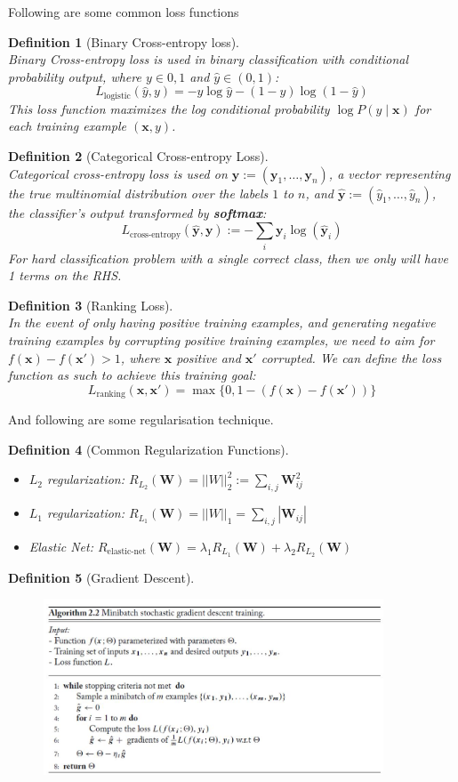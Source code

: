 \documentclass[12pt]{article}
\newtheorem{definition}{Definition}[section]
\theoremstyle{definition}
\newcommand{\x}{\mathbf{x}}
\newcommand{\y}{\mathbf{y}}
\begin{document}
Following are some common loss functions
\begin{definition}[Binary Cross-entropy loss]
\hfill\\\normalfont Binary Cross-entropy loss is used in binary classification with conditional probability output, where $y\in{0,1}$ and $\hat{y}\in(0,1)$:
\[
L_{\text{logistic}}(\hat{y},y)=-y\log \hat{y}-(1-y)\log(1-\hat{y})
\]
This loss function maximizes the log conditional probability $\log P(y\mid \x)$ for each training example $(\x, y)$.
\end{definition}
\begin{definition}[Categorical Cross-entropy Loss]
\hfill\\\normalfont Categorical cross-entropy loss is used on $\y:=(\y_1,\ldots, \y_n)$, a vector representing the true multinomial distribution over the labels $1$ to $n$, and $\hat{\y}:=(\hat{y}_1,\ldots, \hat{y}_n)$, the classifier's output transformed by \textbf{softmax}:
\[
L_{\text{cross-entropy}}(\hat{\y}, \y):=-\sum_{i}\y_i\log(\hat{\y}_i)
\]
For hard classification problem with a single correct class, then we only will have 1 terms on the RHS.
\end{definition}
\begin{definition}[Ranking Loss]
\hfill\\\normalfont In the event of only having positive training examples, and generating negative training examples by corrupting positive training examples, we need to aim for $f(\x)-f(\x')>1$, where $\x$ positive and $\x'$ corrupted. We can define the loss function as such to achieve this training goal:
\[
L_{\text{ranking}}(\x, \x')=\max\{0,1-(f(\x)-f(\x'))\}
\]
\end{definition}
And following are some regularisation technique.
\begin{definition}[Common Regularization Functions]
\begin{itemize}
	\item $L_2$ regularization: $R_{L_2}(\mathbf{W})=||W||_2^2:=\sum_{i,j}\mathbf{W}_{ij}^2$
	\item $L_1$ regularization: $R_{L_1}(\mathbf{W})=||W||_1 = \sum_{i,j}|\mathbf{W}_{ij}|$
	\item Elastic Net: $R_{\text{elastic-net}}(\mathbf{W})=\lambda_1R_{L_1}(\mathbf{W})+\lambda_2R_{L_2}(\mathbf{W})$
\end{itemize}
\end{definition}
\begin{definition}[Gradient Descent]
\begin{figure}[h]
\centering
\includegraphics[width=0.9\textwidth]{gd.jpg}
\end{figure}
\end{definition}
\clearpage
\end{document}
